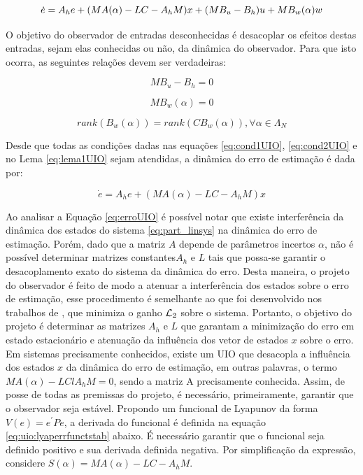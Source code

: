\begin{equation} \footnotesize
    \dot{e}=A_he+(MA(\alpha)-LC-A_hM)x+(MB_u-B_h)u+MB_w(\alpha)w
\end{equation}

O objetivo do observador de entradas desconhecidas é desacoplar os efeitos destas entradas, sejam elas conhecidas ou não, da dinâmica do observador. Para que isto ocorra, as seguintes relações devem ser verdadeiras:

\begin{equation} \label{eq:cond1UIO}
    MB_u-B_h=0    
\end{equation}

\begin{equation} \label{eq:cond2UIO}
    MB_w(\alpha)=0
\end{equation}

\begin{lema} \label{eq:lema1UIO}
    \begin{equation} 
        rank(B_w(\alpha))=rank(CB_w(\alpha)), \forall\alpha \in \Lambda_N
    \end{equation}    
\end{lema}

Desde que todas as condições dadas nas equações \ref{eq:cond1UIO}, \ref{eq:cond2UIO} e no Lema \ref{eq:lema1UIO} sejam atendidas, a dinâmica do erro de estimação é dada por:

\begin{equation} \label{eq:erroUIO}
    \dot{e}=A_he+(MA(\alpha)-LC-A_hM)x
\end{equation}

Ao analisar a Equação \ref{eq:erroUIO} é possível notar que existe interferência da dinâmica dos estados do sistema \ref{eq:part_linsys} na dinâmica do erro de estimação. Porém, dado que a matriz $A$ depende de parâmetros incertos $\alpha$, não é possível determinar matrizes constantes$A_h$ e $L$ tais que possa-se garantir o desacoplamento exato do sistema da dinâmica do erro. Desta maneira, o projeto do observador é feito de modo a atenuar a interferência dos estados sobre o erro de estimação, esse procedimento é semelhante ao que foi desenvolvido nos trabalhos de \cite{ZEMOUCHE200818}, que minimiza o ganho $\mathcal{L}_2$ sobre o sistema. Portanto, o objetivo do projeto é determinar as matrizes $A_h$ e $L$ que garantam a minimização do erro em estado estacionário e atenuação da influência dos vetor de estados $x$ sobre o erro. Em sistemas precisamente conhecidos, existe um UIO que desacopla a influência dos estados $x$ da dinâmica do erro de estimação, em outras palavras, o termo $MA(\alpha)-LClA_hM=0$, sendo a matriz A precisamente conhecida. Assim, de posse de todas as premissas do projeto, é necessário, primeiramente, garantir que o observador seja estável. Propondo um funcional de Lyapunov da forma $V(e)=e^'Pe$, a derivada do funcional é definida na equação \ref{eq:uio:lyaperrfunctstab} abaixo. É necessário garantir que o funcional seja definido positivo e sua derivada definida negativa. Por simplificação da expressão, considere $S(\alpha)=MA(\alpha)-LC-A_hM$.


